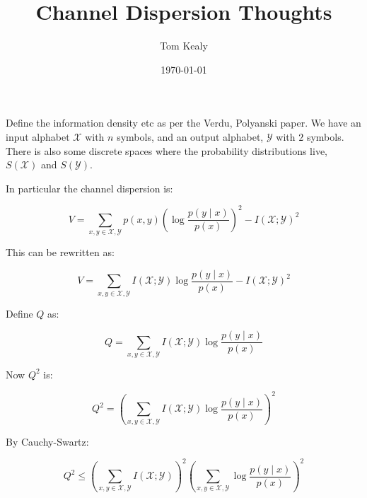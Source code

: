 \documentclass[11pt]{article}
\begin{document}
\title{Channel Dispersion Thoughts}
\author{Tom Kealy}

\date{\today}

\maketitle

Define the information density etc as per the Verdu, Polyanski paper. We have an input alphabet \(\mathscr{X}\) with \(n\) symbols, and an output alphabet, \(\mathscr{Y}\) with \(2\) symbols. There is also some discrete spaces where the probability distributions live, \(S\left(\mathscr{X}\right)\) and \(S\left(\mathscr{Y}\right)\).

In particular the channel dispersion is:

\begin{equation}
V = \sum_{x,y \in \mathscr{X}, \mathscr{Y}} p\left(x,y\right) \left(\log{\frac{p\left(y \mid x\right)}{p\left(x\right)}}\right)^2 - I\left(\mathscr{X} ; \mathscr{Y}\right)^2 
\end{equation}

This can be rewritten as: 

\begin{equation}
V = \sum_{x,y \in \mathscr{X}, \mathscr{Y}} I\left(\mathscr{X} ; \mathscr{Y}\right) \log{\frac{p\left(y \mid x\right)}{p\left(x\right)}} - I\left(\mathscr{X} ; \mathscr{Y}\right)^2
\end{equation}

Define \(Q\) as:

\begin{equation}
Q = \sum_{x,y \in \mathscr{X}, \mathscr{Y}} I\left(\mathscr{X} ; \mathscr{Y}\right) \log{\frac{p\left(y \mid x\right)}{p\left(x\right)}}
\end{equation}

Now \(Q^2\) is:

\begin{equation}
Q^2 = \left( \sum_{x,y \in \mathscr{X}, \mathscr{Y}} I\left(\mathscr{X} ; \mathscr{Y}\right) \log{\frac{p\left(y \mid x\right)}{p\left(x\right)}}\right)^2
\end{equation}

By Cauchy-Swartz:

\begin{equation}
Q^2 \leq \left( \sum_{x,y \in \mathscr{X}, \mathscr{Y}} I\left(\mathscr{X} ; \mathscr{Y}\right)\right)^2 \left( \sum_{x,y \in \mathscr{X}, \mathscr{Y}} \log{\frac{p\left(y \mid x\right)}{p\left(x\right)}}\right)^2
\end{equation}
\end{document}
